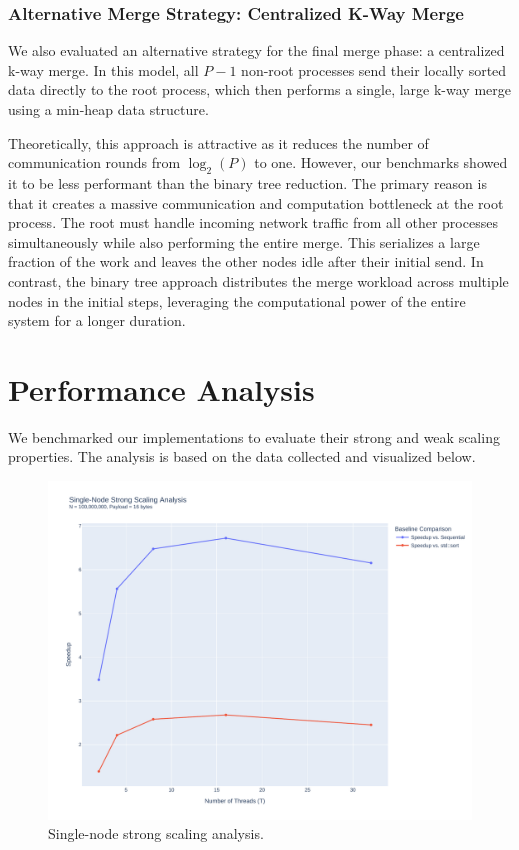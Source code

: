 \documentclass[10pt]{article}
\begin{document}
\subsubsection{Alternative Merge Strategy: Centralized K-Way Merge}
We also evaluated an alternative strategy for the final merge phase: a centralized k-way merge. In this model, all $P-1$ non-root processes send their locally sorted data directly to the root process, which then performs a single, large k-way merge using a min-heap data structure.

Theoretically, this approach is attractive as it reduces the number of communication rounds from $\log_2(P)$ to one. However, our benchmarks showed it to be less performant than the binary tree reduction. The primary reason is that it creates a massive communication and computation bottleneck at the root process. The root must handle incoming network traffic from all other processes simultaneously while also performing the entire merge. This serializes a large fraction of the work and leaves the other nodes idle after their initial send. In contrast, the binary tree approach distributes the merge workload across multiple nodes in the initial steps, leveraging the computational power of the entire system for a longer duration.


\clearpage
\section{Performance Analysis}
We benchmarked our implementations to evaluate their strong and weak scaling properties. The analysis is based on the data collected and visualized below.

\begin{figure}[H]
    \centering
    \includegraphics[width=0.6\linewidth]{../python/plots/strong_scaling.pdf}
    \caption{Single-node strong scaling analysis.}
    \label{fig:strong_scaling}
\end{figure}
\end{document}

